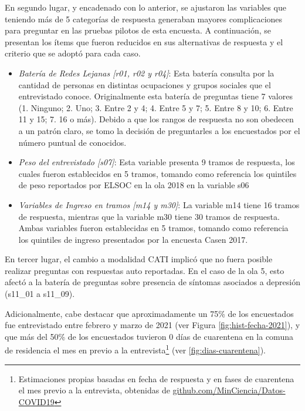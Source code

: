 \documentclass[
  12pt,
]{book}
\begin{document}
En segundo lugar, y encadenado con lo anterior, se ajustaron las variables que teniendo más de 5 categorías de respuesta generaban mayores complicaciones para preguntar en las pruebas pilotos de esta encuesta. A continuación, se presentan los ítems que fueron reducidos en sus alternativas de respuesta y el criterio que se adoptó para cada caso.

\begin{itemize}
\item
  \emph{Batería de Redes Lejanas {[}r01, r02 y r04{]}}: Esta batería consulta por la cantidad de personas en distintas ocupaciones y grupos sociales que el entrevistado conoce. Originalmente esta batería de preguntas tiene 7 valores (1. Ninguno; 2. Uno; 3. Entre 2 y 4; 4. Entre 5 y 7; 5. Entre 8 y 10; 6. Entre 11 y 15; 7. 16 o más). Debido a que los rangos de respuesta no son obedecen a un patrón claro, se tomo la decisión de preguntarles a los encuestados por el número puntual de conocidos.
\item
  \emph{Peso del entrevistado {[}s07{]}}: Esta variable presenta 9 tramos de respuesta, los cuales fueron establecidos en 5 tramos, tomando como referencia los quintiles de peso reportados por ELSOC en la ola 2018 en la variable s06
\item
  \emph{Variables de Ingreso en tramos {[}m14 y m30{]}}: La variable m14 tiene 16 tramos de respuesta, mientras que la variable m30 tiene 30 tramos de respuesta. Ambas variables fueron establecidas en 5 tramos, tomando como referencia los quintiles de ingreso presentados por la encuesta Casen 2017.
\end{itemize}

En tercer lugar, el cambio a modalidad CATI implicó que no fuera posible realizar preguntas con respuestas auto reportadas. En el caso de la ola 5, esto afectó a la batería de preguntas sobre presencia de síntomas asociados a depresión (s11\_01 a s11\_09).

Adicionalmente, cabe destacar que aproximadamente un 75\% de los encuestados fue entrevistado entre febrero y marzo de 2021 (ver Figura \ref{fig:hist-fecha-2021}), y que más del 50\% de los encuestados tuvieron 0 días de cuarentena en la comuna de residencia el mes en previo a la entrevista\footnote{Estimaciones propias basadas en fecha de respuesta y en fases de cuarentena el mes previo a la entrevista, obtenidas de \href{https://github.com/MinCiencia/Datos-COVID19}{github.com/MinCiencia/Datos-COVID19}} (ver \ref{fig:dias-cuarentena}).
\end{document}

